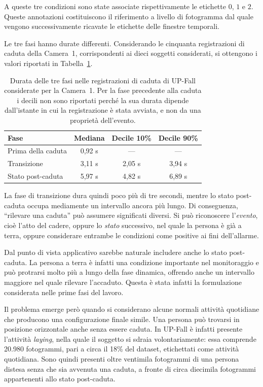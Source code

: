 A queste tre condizioni sono state associate rispettivamente le etichette $0$, $1$ e $2$. Queste annotazioni costituiscono il riferimento a livello di fotogramma dal quale vengono successivamente ricavate le etichette delle finestre temporali.

Le tre fasi hanno durate differenti. Considerando le cinquanta registrazioni di caduta della Camera~1, corrispondenti ai dieci soggetti considerati, si ottengono i valori riportati in Tabella~\ref{tab:durate_fasi}.

\begin{table}[ht]
\centering
\caption{Durata delle tre fasi nelle registrazioni di caduta di UP-Fall
considerate per la Camera~1. Per la fase precedente alla caduta i decili non
sono riportati perché la sua durata dipende dall'istante in cui la
registrazione è stata avviata, e non da una proprietà dell'evento.}
\label{tab:durate_fasi}
\begin{tabular}{lccc}
\toprule
\textbf{Fase} & \textbf{Mediana} & \textbf{Decile 10\%} & \textbf{Decile 90\%} \\
\midrule
Prima della caduta & 0,92 s & --- & --- \\
Transizione & 3,11 s & 2,05 s & 3,94 s \\
Stato post-caduta & 5,97 s & 4,82 s & 6,89 s \\
\bottomrule
\end{tabular}
\end{table}

La fase di transizione dura quindi poco più di tre secondi, mentre lo stato post-caduta occupa mediamente un intervallo ancora più lungo. Di conseguenza, ``rilevare una caduta'' può assumere significati diversi. Si può riconoscere l'\emph{evento}, cioè l'atto del cadere, oppure lo \emph{stato} successivo, nel quale la persona è già a terra, oppure considerare entrambe le condizioni come positive ai fini dell'allarme.

Dal punto di vista applicativo sarebbe naturale includere anche lo stato post-caduta. La persona a terra è infatti una condizione importante nel monitoraggio e può protrarsi molto più a lungo della fase dinamica, offrendo anche un intervallo maggiore nel quale rilevare l'accaduto. Questa è stata infatti la formulazione considerata nelle prime fasi del lavoro.

Il problema emerge però quando si considerano alcune normali attività quotidiane che producono una configurazione finale simile. Una persona può trovarsi in posizione orizzontale anche senza essere caduta. In UP-Fall è infatti presente l'attività \emph{laying}, nella quale il soggetto si sdraia volontariamente: essa comprende 20.980 fotogrammi, pari a circa il 18\% del dataset, etichettati come attività quotidiana. Sono quindi presenti oltre ventimila fotogrammi di una persona distesa senza che sia avvenuta una caduta, a fronte di circa diecimila fotogrammi appartenenti allo stato post-caduta.

